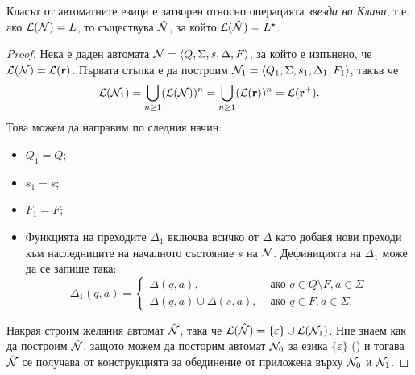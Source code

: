 \begin{lemma}
  \label{lem:kleene-star}
  Класът от автоматните езици е затворен относно операцията {\em звезда на Клини}, т.е.
  ако $\mathcal{L}(\mathcal{N}) = L$, то съществува $\hat{\mathcal{N}}$, за който $\mathcal{L}(\hat{\mathcal{N}}) = L^\star$.
\end{lemma}
\begin{proof}
  Нека е даден автомата $\mathcal{N} = \langle{Q,\Sigma,s,\Delta,F}\rangle$, за който е изпънено, че
  $\mathcal{L}(\mathcal{N}) = \mathcal{L}(\mathbf{r})$.
  Първата стъпка е да построим $\mathcal{N}_1 = \langle{Q_1,\Sigma,s_1,\Delta_1,F_1}\rangle$, такъв че 
  \[\mathcal{L}(\mathcal{N}_1) = \bigcup_{n\geq 1} (\mathcal{L}(\mathcal{N}))^n = \bigcup_{n\geq 1} (\mathcal{L}(\mathbf{r}))^n = \mathcal{L}(\mathbf{r^+}).\]
  Това можем да направим по следния начин:
  \begin{itemize}
  \item
    $Q_1 = Q$;
  \item
    $s_1 = s$;
  \item
    $F_1 = F$;
  \item
    Функцията на преходите $\Delta_1$ включва всичко от $\Delta$ като добавя нови преходи към наследниците на началното състояние $s$ на $\mathcal{N}$. Дефиницията на $\Delta_1$ може да се запише така:
    \[\Delta_1(q,a) = 
    \begin{cases}
      \Delta(q,a), & \text{ ако } q\in Q\setminus F, a \in \Sigma\\
      \Delta(q,a) \cup \Delta(s,a), & \text{ ако } q\in F, a\in\Sigma.
    \end{cases}\]
  \end{itemize}
  Накрая строим желания автомат $\hat{\mathcal{N}}$, така че $\mathcal{L}(\hat{\mathcal{N}}) = \{\varepsilon\} \cup \mathcal{L}(\mathcal{N}_1)$.
  Ние знаем как да построим $\hat{\mathcal{N}}$, защото можем да посторим автомат $\mathcal{N}_0$ за езика $\{\varepsilon\}$
  () и тогава $\hat{\mathcal{N}}$ се получава от конструкцията за обединение от  приложена върху $\mathcal{N}_0$ и $\mathcal{N}_1$.
\end{proof}


